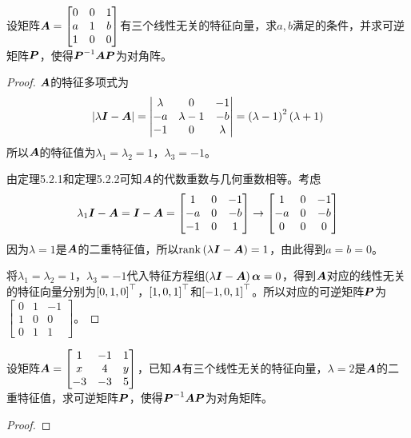 \begin{problem}
设矩阵\(\boldsymbol{A}=\begin{bmatrix}0&0&1\\a&1&b\\1&0&0\end{bmatrix}\)有三个线性无关的特征向量，求\(a,b\)满足的条件，并求可逆矩阵\(\boldsymbol{P}\)，使得\({\boldsymbol{P}}^{-1}\boldsymbol{A}\boldsymbol{P}\)为对角阵。
\end{problem}
\begin{proof}
    \(\boldsymbol{A}\)的特征多项式为
    \begin{equation*}
        \left|\lambda\boldsymbol{I}-\boldsymbol{A} \right|=\begin{vmatrix}\lambda&0&-1\\-a&\lambda-1&-b\\-1&0&\lambda\end{vmatrix}=\left( \lambda-1 \right)^2\left( \lambda+1 \right)
    \end{equation*}
    所以\(\boldsymbol{A}\)的特征值为\(\lambda_1=\lambda_2=1\)，\(\lambda_3=-1\)。

    由定理5.2.1和定理5.2.2可知\(\boldsymbol{A}\)的代数重数与几何重数相等。考虑
    \begin{equation*}
        \lambda_1\boldsymbol{I}-\boldsymbol{A}=\boldsymbol{I}-\boldsymbol{A}=
        \begin{bmatrix}
            1  & 0 & -1 \\
            -a & 0 & -b \\
            -1 & 0 & 1
        \end{bmatrix}\to
        \begin{bmatrix}
            1  & 0 & -1 \\
            -a & 0 & -b \\
            0  & 0 & 0
        \end{bmatrix}
    \end{equation*}
    因为\(\lambda=1\)是\(\boldsymbol{A}\)的二重特征值，所以\(\mathrm{rank}\left( \lambda\boldsymbol{I}-\boldsymbol{A} \right)=1\)，由此得到\(a=b=0\)。

    将\(\lambda_1=\lambda_2=1\)，\(\lambda_3=-1\)代入特征方程组\(\left( \lambda\boldsymbol{I}-\boldsymbol{A} \right)\boldsymbol{\alpha}=0\)，得到\(\boldsymbol{A}\)对应的线性无关的特征向量分别为\(\left[ 0,1,0 \right]^\top\)，\(\left[ 1,0,1 \right]^\top\)和\(\left[ -1,0,1 \right]^\top\)。所以对应的可逆矩阵\(\boldsymbol{P}\)为\(\begin{bmatrix}0&1&-1\\1&0&0\\0&1&1\end{bmatrix}\)。
\end{proof}

\begin{problem}
设矩阵\(\boldsymbol{A}=\begin{bmatrix}1&-1&1\\x&4&y\\-3&-3&5\end{bmatrix}\)，已知\(\boldsymbol{A}\)有三个线性无关的特征向量，\(\lambda=2\)是\(\boldsymbol{A}\)的二重特征值，求可逆矩阵\(\boldsymbol{P}\)，使得\({\boldsymbol{P}}^{-1}\boldsymbol{A}\boldsymbol{P}\)为对角矩阵。
\end{problem}
\begin{proof}
\end{proof}

